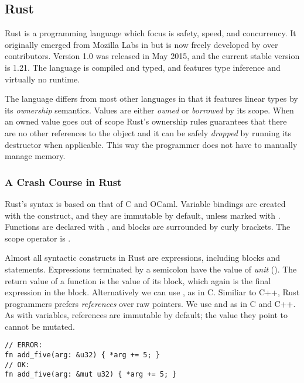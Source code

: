 \documentclass[a4paper,twoside]{article}
\begin{document}
\subsection{Rust}
Rust is a programming language which focus is safety, speed, and concurrency.
It originally emerged from Mozilla Labs in  but is now freely developed
by over  contributors.
Version 1.0 was released in May 2015, and the current stable version is 1.21.
The language is compiled and typed, and features
type inference and virtually no runtime.

The language differs from most other languages in that it features linear types
by its \emph{ownership} semantics.
Values are either \emph{owned} or \emph{borrowed} by its scope.
When an owned value goes out of scope Rust's ownership rules guarantees that
there are no other references to the object and it can be safely \emph{dropped}
by running its destructor when applicable.
This way the programmer does not have to manually manage memory.

\subsubsection{A Crash Course in Rust}

Rust's syntax is based on that of C and OCaml.
Variable bindings are created with the  construct,
and they are immutable by default, unless marked with .
Functions are declared with , and blocks are surrounded by curly brackets.
The scope operator is \code{::}.

Almost all syntactic constructs in Rust are expressions, including blocks and
 statements.
Expressions terminated by a semicolon have the value of \emph{unit} (\code{()}).
The return value of a function is the value of its block, which again is the final
expression in the block. Alternatively we can use , as in C.
Similiar to C++, Rust programmers prefers \emph{references} over raw pointers.
We use \code{\&} and \code{*} as in C and C++.
As with variables, references are immutable by default; the value they point
to cannot be mutated.

\begin{lstlisting}[firstnumber=last]
// ERROR:
fn add_five(arg: &u32) { *arg += 5; }
// OK:
fn add_five(arg: &mut u32) { *arg += 5; }
\end{lstlisting}
\end{document}
